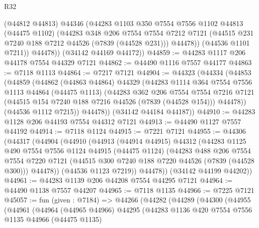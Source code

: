 \begin{lexlean}{R32}
\begin{coremodule}
            (@44812 @44813)
            @44346
            (@44283
              @1103
              @350
              @7554
              @7556
              @1102
              @44813
              (@44475 @1102)
              (@44283
                @348
                @206
                @7554
                @7554
                @7212
                @7121
                (@44515 @231 @7240 @188 @7212 @44526 (@7839 (@44528 @231)))
                @44478))
            (@44536 @1101 @7211))
          @44478))
      (@34142 @44169 @44172))
@44859 := @44283 @1117 @206 @44178 @7554 @44329 @7121
@44862 := @44490 @1116 @7557 @44177
@44863 := @7118 @1113
@44864 := @7217 @7121
@44904 := @44323
    (@44334
      (@44853
        (@44859
          (@44862
            (@44863 @44864)
            @44329
            (@44283
              @1114
              @364
              @7554
              @7556
              @1113
              @44864
              (@44475 @1113)
              (@44283
                @362
                @206
                @7554
                @7554
                @7216
                @7121
                (@44515 @154 @7240 @188 @7216 @44526 (@7839 (@44528 @154)))
                @44478))
            (@44536 @1112 @7215))
          @44478))
      (@34142 @44184 @44187))
@44910 := @44283 @1128 @206 @44193 @7554 @44312 @7121
@44913 := @44490 @1127 @7557 @44192
@44914 := @7118 @1124
@44915 := @7221 @7121
@44955 := @44306
    (@44317
      (@44904
        (@44910
          (@44913
            (@44914 @44915)
            @44312
            (@44283
              @1125
              @490
              @7554
              @7556
              @1124
              @44915
              (@44475 @1124)
              (@44283
                @488
                @206
                @7554
                @7554
                @7220
                @7121
                (@44515 @300 @7240 @188 @7220 @44526 (@7839 (@44528 @300)))
                @44478))
            (@44536 @1123 @7219))
          @44478))
      (@34142 @44199 @44202))
@44961 := @44283 @1139 @206 @44208 @7554 @44295 @7121
@44964 := @44490 @1138 @7557 @44207
@44965 := @7118 @1135
@44966 := @7225 @7121
@45057 := fun (given : @7184) =>
  @44266
    (@44282
      (@44289
        (@44300
          (@44955
            (@44961
              (@44964
                (@44965 @44966)
                @44295
                (@44283
                  @1136
                  @420
                  @7554
                  @7556
                  @1135
                  @44966
                  (@44475 @1135)

\end{coremodule}
\end{lexlean}
